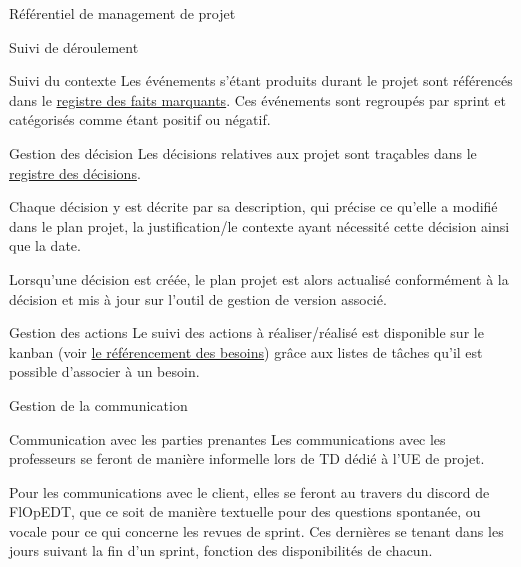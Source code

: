\documentclass[]{article}
\begin{document}
{\begin{section}{\label{sec:Référentiel de management de projet}Référentiel de management de projet}
     \begin{subsection}{\label{sec:Suivi de déroulement}Suivi de déroulement}
         \begin{subsubsection}{\label{sec:Suivi du contexte}Suivi du contexte}
             Les événements s'étant produits durant le projet sont référencés dans le \href{documents/Registre_des_faits_marquants.pdf}{registre des faits marquants}. Ces événements sont regroupés par sprint et catégorisés comme étant positif ou négatif.
         \end{subsubsection}

         \begin{subsubsection}{\label{sec:Gestion des décision}Gestion des décision}
             Les décisions relatives aux projet sont traçables dans le \href{documents/Registre_des_décisions.pdf}{registre des décisions}.

             Chaque décision y est décrite par sa description, qui précise ce qu’elle a modifié dans le plan projet, la justification/le contexte ayant nécessité cette décision ainsi que la date.

             Lorsqu’une décision est créée, le plan projet est alors actualisé conformément à la décision et mis à jour sur l’outil de gestion de version associé.
         \end{subsubsection}

         \begin{subsubsection}{\label{sec:Gestion des actions}Gestion des actions}
             Le suivi des actions à réaliser/réalisé est disponible sur le kanban (voir \hyperref[sec:Référencement des besoins]{le référencement des besoins}) grâce aux listes de tâches qu’il est possible d’associer à un besoin.
         \end{subsubsection}
     \end{subsection}

     \begin{subsection}{\label{sec:Gestion de la communication}Gestion de la communication}
         \begin{subsubsection}{\label{sec:Communication avec les parties prenantes}Communication avec les parties prenantes}
             Les communications avec les professeurs se feront de manière informelle lors de TD dédié à l’UE de projet.

             Pour les communications avec le client, elles se feront au travers du discord de FlOpEDT, que ce soit de manière textuelle pour des questions spontanée, ou vocale pour ce qui concerne les revues de sprint. Ces dernières se tenant dans les jours suivant la fin d’un sprint, fonction des disponibilités de chacun.


\end{subsubsection}
\end{subsection}
\end{section}}
\end{document}

